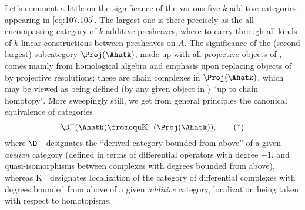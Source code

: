 Let's comment a little on the significance of the various five
$k$-additive categories appearing in \eqref{eq:107.105}. The largest
one \Ahatk{} is there precisely as the all-encompassing category of
$k$-additive presheaves, where to carry through all kinds of
$k$-linear constructions between presheaves on $A$. The significance
of the (second largest) subcategory $\Proj(\Ahatk)$, made up with all
projective objects of \Ahatk, comes mainly from homological algebra
and emphasis upon replacing objects of \Ahatk{} by projective
resolutions; these are chain complexes in $\Proj(\Ahatk)$, which may
be viewed as being defined (by any given object in \Ahatk) ``up to
chain homotopy''. More sweepingly still, we get from general
principles the canonical equivalence of categories
\begin{equation}
  \label{eq:107.star}
  \D^-(\Ahatk) \fromequ \mathrm K^-(\Proj(\Ahatk)),\tag{*}
\end{equation}
where $\D^-$ designates the ``derived category bounded from
above'' of a given \emph{abelian} category (defined in
terms of differential operators with degree $+1$, and
quasi-isomorphisms between complexes with degrees bounded from above),
whereas $\mathrm K^-$ designates localization of the category of
differential complexes with degrees bounded from above of a given
\emph{additive} category, localization being taken with respect to
homotopisms.

